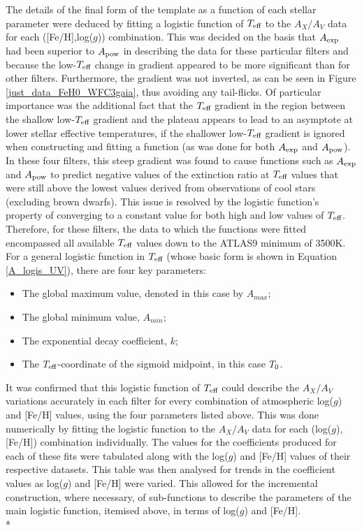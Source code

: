 \documentclass[12pt, a4paper]{report}
\begin{document}
The details of the final form of the template as a function of each stellar parameter were deduced by fitting a logistic function of $T_{\textnormal{eff}}$ to the $A_{X}/A_{V}$ data for each ([Fe/H],log($g$)) combination. This was decided on the basis that $A_{\textnormal{exp}}$ had been superior to $A_{\textnormal{pow}}$ in describing the data for these particular filters and because the low-$T_{\textnormal{eff}}$ change in gradient appeared to be more significant than for other filters. Furthermore, the gradient was not inverted, as can be seen in Figure \ref{just_data_FeH0_WFC3gaia}, thus avoiding any tail-flicks. Of particular importance was the additional fact that the $T_{\textnormal{eff}}$ gradient in the region between the shallow low-$T_{\textnormal{eff}}$ gradient and the plateau appears to lead to an asymptote at lower stellar effective temperatures, if the shallower low-$T_{\textnormal{eff}}$ gradient is ignored when constructing and fitting a function (as was done for both $A_{\textnormal{exp}}$ and $A_{\textnormal{pow}}$). In these four filters, this steep gradient was found to cause functions such as $A_{\textnormal{exp}}$ and $A_{\textnormal{pow}}$ to predict negative values of the extinction ratio at $T_{\textnormal{eff}}$ values that were still above the lowest values derived from observations of cool stars (excluding brown dwarfs). This issue is resolved by the logistic function's property of converging to a constant value for both high and low values of $T_{\textnormal{eff}}$. Therefore, for these filters, the data to which the functions were fitted encompassed all available $T_{\textnormal{eff}}$ values down to the ATLAS9 minimum of 3500K. For a general logistic function in $T_{\textnormal{eff}}$ (whose basic form is shown in Equation \ref{A_logis_UV}), there are four key parameters:

\begin{itemize}
\item The global maximum value, denoted in this case by $A_{max}$;
\item The global minimum value, $A_{min}$;
\item The exponential decay coefficient, $k$;
\item The $T_{\textnormal{eff}}$-coordinate of the sigmoid midpoint, in this case $T_{\textnormal{0}}$.
\end{itemize}

It was confirmed that this logistic function of $T_{\textnormal{eff}}$ could describe the $A_{X}/A_{V}$ variations accurately in each filter for every combination of atmospheric log($g$) and [Fe/H] values, using the four parameters listed above. This was done numerically by fitting the logistic function to the $A_{X}/A_{V}$ data for each (log($g$),[Fe/H]) combination individually. The values for the coefficients produced for each of these fits were tabulated along with the log($g$) and [Fe/H] values of their respective datasets. This table was then analysed for trends in the coefficient values as log($g$) and [Fe/H] were varied. This allowed for the incremental construction, where necessary, of sub-functions to describe the parameters of the main logistic function, itemised above, in terms of log($g$) and [Fe/H].\\*
\end{document}

